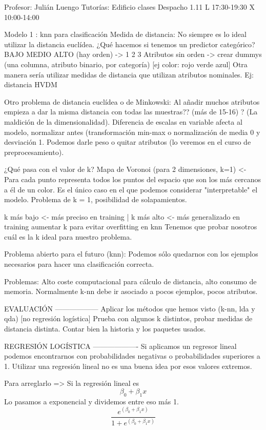 Profesor: Julián Luengo 
Tutorías: Edificio clases Despacho 1.11 L 17:30-19:30 X 10:00-14:00

Modelo 1 : knn para clasificación
Medida de distancia: No siempre es lo ideal utilizar la distancia euclídea.
¿Qué hacemos si tenemos un predictor categórico?
BAJO MEDIO ALTO (hay orden) -> 1 2  3
Atributos sin orden -> crear dummys (una columna, atributo binario, por categoría) [ej color: rojo verde azul]
Otra manera sería utilizar medidas de distancia que utilizan atributos nominales. Ej: distancia HVDM

Otro problema de distancia euclídea o de Minkowski:
Al añadir muchos atributos empieza a dar la misma distancia con todas las muestras?? (más de 15-16) ? (La maldición de la dimensionalidad).
Diferencia de escalas en variable afecta al modelo, normalizar antes (transformación min-max o normalización de media 0 y desviación 1.
Podemos darle peso o quitar atributos (lo veremos en el curso de preprocesamiento).

¿Qué pasa con el valor de k?
Mapa de Voronoi (para 2 dimensiones, k=1) <- Para cada punto representa todos los puntos del espacio que son los más cercanos a él de un color. Es el único caso en el que podemos considerar "interpretable" el modelo.
Problema de k = 1, posibilidad de solapamientos.

k más bajo <- más preciso en training | k más alto <- más generalizado en training
aumentar k para evitar overfitting en knn
Tenemos que probar nosotros cuál es la k ideal para nuestro problema.

Problema abierto para el futuro (knn): Podemos sólo quedarnos con los ejemplos necesarios para hacer una clasificación correcta.

Problemas: Alto coste computacional para cálculo de distancia, alto consumo de memoria.
Normalmente k-nn debe ir asociado a pocos ejemplos, pocos atributos.


EVALUACIÓN
------------------
Aplicar los métodos que hemos visto (k-nn, lda y qda) [no regresión logística]
Prueba con algunos k distintos, probar medidas de distancia distinta. Contar bien la historia y los paquetes usados.


REGRESIÓN LOGÍSTICA
-------------------
Si aplicamos un regresor lineal podemos encontrarnos con probabilidades negativas o probabilidades superiores a 1. Utilizar una regresión lineal no es una buena idea por esos valores extremos.

Para arreglarlo => Si la regresión lineal es 
$$\beta_0 + \beta_1x$$
Lo pasamos a exponencial y dividemos entre eso más 1.
$$\frac{e^{(\beta_0 + \beta_1x)}}{1 + e^{(\beta_0 + \beta_1x)}}$$

